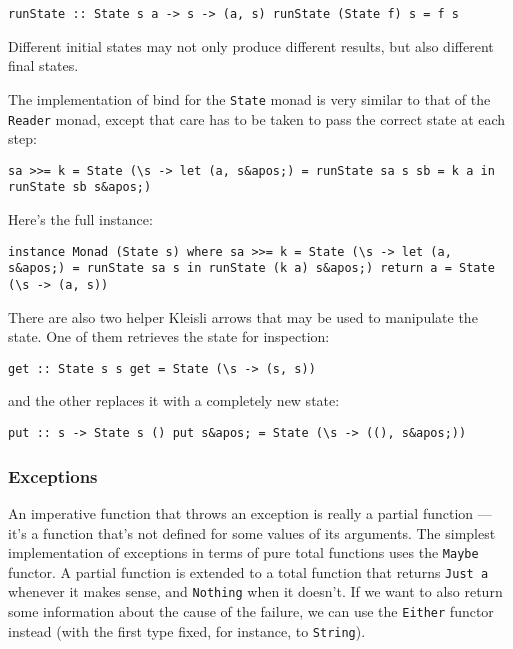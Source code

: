 \begin{verbatim}
runState :: State s a -> s -> (a, s) runState (State f) s = f s
\end{verbatim}

Different initial states may not only produce different results, but
also different final states.

The implementation of bind for the \texttt{State} monad is very similar
to that of the \texttt{Reader} monad, except that care has to be taken
to pass the correct state at each step:

\begin{verbatim}
sa >>= k = State (\s -> let (a, s&apos;) = runState sa s sb = k a in runState sb s&apos;)
\end{verbatim}

Here's the full instance:

\begin{verbatim}
instance Monad (State s) where sa >>= k = State (\s -> let (a, s&apos;) = runState sa s in runState (k a) s&apos;) return a = State (\s -> (a, s))
\end{verbatim}

There are also two helper Kleisli arrows that may be used to manipulate
the state. One of them retrieves the state for inspection:

\begin{verbatim}
get :: State s s get = State (\s -> (s, s))
\end{verbatim}

and the other replaces it with a completely new state:

\begin{verbatim}
put :: s -> State s () put s&apos; = State (\s -> ((), s&apos;))
\end{verbatim}

\subsubsection{Exceptions}\label{exceptions}

An imperative function that throws an exception is really a partial
function --- it's a function that's not defined for some values of its
arguments. The simplest implementation of exceptions in terms of pure
total functions uses the \texttt{Maybe} functor. A partial function is
extended to a total function that returns \texttt{Just\ a} whenever it
makes sense, and \texttt{Nothing} when it doesn't. If we want to also
return some information about the cause of the failure, we can use the
\texttt{Either} functor instead (with the first type fixed, for
instance, to \texttt{String}).

